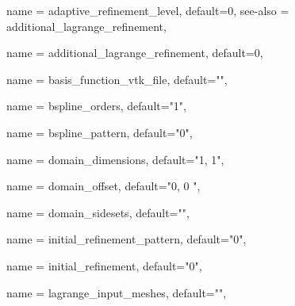 \begin{parameter}{
    name = {adaptive_refinement_level},
    default={0},
    see-also = {additional_lagrange_refinement},
    }

\end{parameter}

\begin{parameter}{
    name = {additional_lagrange_refinement},
    default={0},
    }
\end{parameter}

\begin{parameter}{
    name = {basis_function_vtk_file},
    default={""},
    }
\end{parameter}

\begin{parameter}{
    name = {bspline_orders},
    default={"1"},
    }
\end{parameter}

\begin{parameter}{
    name = {bspline_pattern},
    default={"0"},
    }
\end{parameter}

\begin{parameter}{
    name = {domain_dimensions},
    default={"1, 1"},
    }
\end{parameter}

\begin{parameter}{
    name = {domain_offset},
    default={"0, 0 "},
    }
\end{parameter}

\begin{parameter}{
    name = {domain_sidesets},
    default={""},
    }
\end{parameter}

\begin{parameter}{
    name = {initial_refinement_pattern},
    default={"0"},
    }
\end{parameter}

\begin{parameter}{
    name = {initial_refinement},
    default={"0"},
    }
\end{parameter}

\begin{parameter}{
    name = {lagrange_input_meshes},
    default={""},
    }
\end{parameter}

